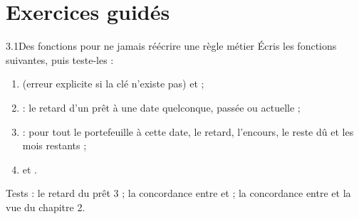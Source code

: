 \section{Exercices guidés}

\begin{exercice}{3.1}{Des fonctions pour ne jamais réécrire une règle métier}
Écris les fonctions suivantes, puis teste-les :
\begin{enumerate}[label=\alph*)]
\item {} (erreur explicite si la clé n'existe pas) et  ;
\item {} : le retard d'un prêt à une date quelconque, passée ou
actuelle ;
\item {} : pour tout le portefeuille à cette date, le retard, l'encours, le
reste dû et les mois restants ;
\item {} et .
\end{enumerate}
Tests : le retard du prêt 3 ; la concordance entre  et  ;
la concordance entre  et la vue du chapitre 2.
\end{exercice}

